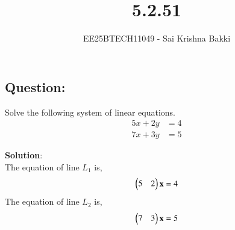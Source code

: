 \documentclass[journal]{IEEEtran}
\begin{document}

\vspace{3cm}

\title{5.2.51}
\author{EE25BTECH11049 - Sai Krishna Bakki}
\maketitle

\subsection*{Question: } 
    Solve the following system of linear equations.
    \begin{align*}
        5x+2y &= 4
    \end{align*}
    \begin{align*}
        7x + 3y &= 5
    \end{align*}

\textbf{Solution}:\\
The equation of line $L_1$ is,
\begin{align}
    \begin{pmatrix}5 & 2\end{pmatrix}\mathbf{x} = 4
\end{align}
The equation of line $L_2$ is,
\begin{align}
    \begin{pmatrix}7 & 3\end{pmatrix}\mathbf{x} = 5
\end{align}
\end{document}
